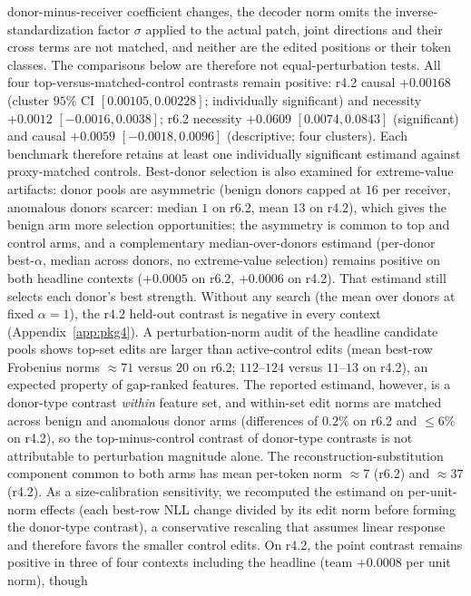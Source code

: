 \documentclass[10pt]{article} %
\newcommand{\rsix}{r6.2}
\newcommand{\rfour}{r4.2}
\begin{document}
donor-minus-receiver coefficient changes, the decoder norm omits the
inverse-standardization factor $\sigma$ applied to the actual patch, joint
directions and their cross terms are not matched, and neither are the edited
positions or their token classes. The comparisons below are therefore not
equal-perturbation tests.
All four top-versus-matched-control contrasts remain positive: \rfour{}
causal $+0.00168$ (cluster $95\%$ CI $[0.00105, 0.00228]$; individually
significant) and necessity $+0.0012$ $[-0.0016, 0.0038]$; \rsix{} necessity
$+0.0609$ $[0.0074, 0.0843]$ (significant) and causal $+0.0059$
$[-0.0018, 0.0096]$ (descriptive; four clusters). Each benchmark therefore
retains at least one individually significant estimand against proxy-matched
controls.
Best-donor selection is also examined for extreme-value artifacts: donor
pools are asymmetric (benign donors capped at $16$ per receiver, anomalous
donors scarcer: median $1$ on \rsix{}, mean $13$ on \rfour{}), which
gives the benign arm more selection opportunities; the asymmetry is common
to top and control arms, and a complementary median-over-donors estimand
(per-donor best-$\alpha$, median across donors, no extreme-value
selection) remains positive on both headline contexts ($+0.0005$ on
\rsix{}, $+0.0006$ on \rfour{}). That estimand still selects each donor's
best strength. Without any search (the mean over donors at fixed
$\alpha{=}1$), the \rfour{} held-out contrast is negative in every context
(Appendix~\ref{app:pkg4}).
A perturbation-norm audit of the headline candidate pools shows
top-set edits are larger than active-control edits (mean best-row Frobenius
norms $\approx 71$ versus $20$ on \rsix{}; $112$--$124$ versus $11$--$13$
on \rfour{}), an expected property of gap-ranked features. The reported
estimand, however, is a donor-type contrast \emph{within} feature set, and
within-set edit norms are matched across benign and anomalous donor arms
(differences of $0.2\%$ on \rsix{} and $\leq 6\%$ on \rfour{}), so the
top-minus-control contrast of donor-type contrasts is not attributable to
perturbation magnitude alone. The reconstruction-substitution component
common to both arms has mean per-token norm $\approx 7$ (\rsix{}) and
$\approx 37$ (\rfour{}). As a size-calibration sensitivity, we recomputed
the estimand on per-unit-norm effects (each best-row NLL change divided by
its edit norm before forming the donor-type contrast), a conservative
rescaling that assumes linear response and therefore favors the smaller
control edits. On \rfour{}, the point contrast remains positive in three of
four contexts including the headline (team $+0.0008$ per unit norm), though
\end{document}
